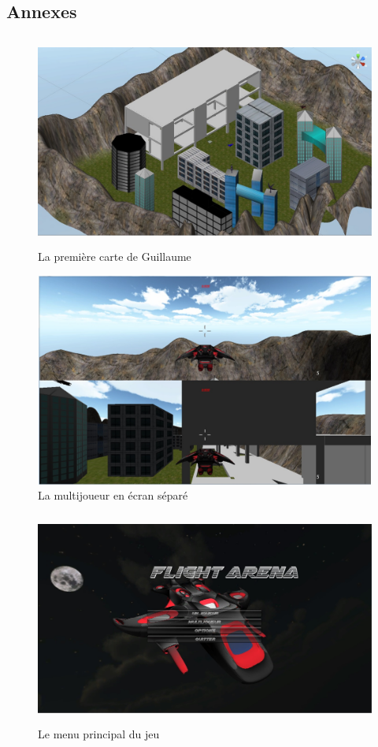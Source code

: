 \documentclass[12pt, titlepage]{article}
\begin{document}
\begin{spacing}{1.5}
\newpage
\section{Annexes}

\begin{figure}[h]
\center
\includegraphics[height=7cm, width=12cm]{niveau_guillaume.jpg}
\caption{La première carte de Guillaume}
\end{figure}

\begin{figure}[h]
\center
\includegraphics[height=7cm, width=12cm]{split.jpg}
\caption{La multijoueur en écran séparé}
\end{figure}

\begin{figure}[h]
\center
\includegraphics[height=7cm, width=12cm]{menu_arthur.jpg}
\caption{Le menu principal du jeu}
\end{figure}


\end{spacing}
\end{document}
